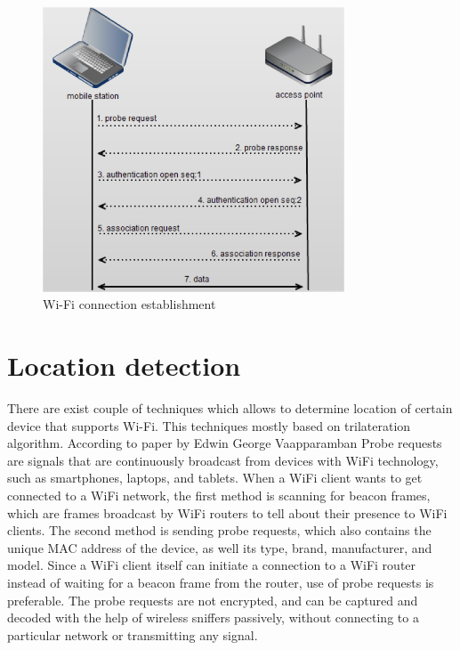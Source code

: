 \documentclass[a4paper,11pt]{article}
\begin{document}
\begin{figure}[h]
    \centering
    \includegraphics[width=0.8\textwidth]{probe.png}
    \caption{Wi-Fi connection establishment}
    \label{fig:probe}
\end{figure}

\section{Location detection}
There are exist couple of techniques which allows to determine location of certain device that supports Wi-Fi. This techniques mostly based on trilateration algorithm. According to paper by Edwin George Vaapparamban \cite{edwin16} Probe requests are signals that are continuously broadcast from devices with WiFi technology, such as smartphones, laptops, and tablets. When a WiFi client wants to get connected to a WiFi network, the first method is scanning for beacon frames, which are frames broadcast by WiFi routers to tell about their presence to WiFi clients. The second method is sending probe requests, which also contains the unique MAC address of the device, as well its type, brand, manufacturer, and model. Since a WiFi client itself can initiate a connection to a WiFi router instead of waiting for a beacon frame from the router, use of probe requests is preferable. The probe requests are not encrypted, and can be captured and decoded with the help of wireless sniffers passively, without connecting to a particular network or transmitting any signal.
\end{document}
